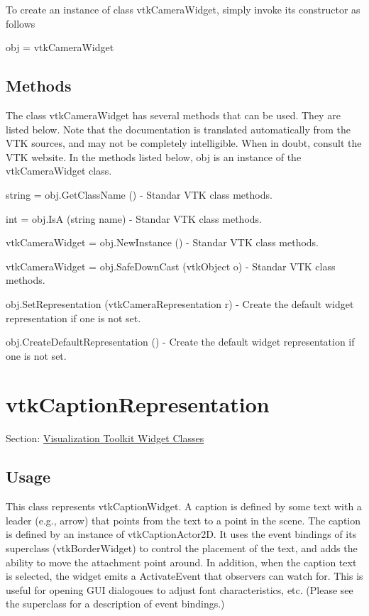 To create an instance of class vtk\-Camera\-Widget, simply invoke its constructor as follows \begin{DoxyVerb}  obj = vtkCameraWidget
\end{DoxyVerb}
 \hypertarget{vtkwidgets_vtkxyplotwidget_Methods}{}\subsection{Methods}\label{vtkwidgets_vtkxyplotwidget_Methods}
The class vtk\-Camera\-Widget has several methods that can be used. They are listed below. Note that the documentation is translated automatically from the V\-T\-K sources, and may not be completely intelligible. When in doubt, consult the V\-T\-K website. In the methods listed below, {\ttfamily obj} is an instance of the vtk\-Camera\-Widget class. 
\begin{DoxyItemize}
\item {\ttfamily string = obj.\-Get\-Class\-Name ()} -\/ Standar V\-T\-K class methods.  
\item {\ttfamily int = obj.\-Is\-A (string name)} -\/ Standar V\-T\-K class methods.  
\item {\ttfamily vtk\-Camera\-Widget = obj.\-New\-Instance ()} -\/ Standar V\-T\-K class methods.  
\item {\ttfamily vtk\-Camera\-Widget = obj.\-Safe\-Down\-Cast (vtk\-Object o)} -\/ Standar V\-T\-K class methods.  
\item {\ttfamily obj.\-Set\-Representation (vtk\-Camera\-Representation r)} -\/ Create the default widget representation if one is not set.  
\item {\ttfamily obj.\-Create\-Default\-Representation ()} -\/ Create the default widget representation if one is not set.  
\end{DoxyItemize}\hypertarget{vtkwidgets_vtkcaptionrepresentation}{}\section{vtk\-Caption\-Representation}\label{vtkwidgets_vtkcaptionrepresentation}
Section\-: \hyperlink{sec_vtkwidgets}{Visualization Toolkit Widget Classes} \hypertarget{vtkwidgets_vtkxyplotwidget_Usage}{}\subsection{Usage}\label{vtkwidgets_vtkxyplotwidget_Usage}
This class represents vtk\-Caption\-Widget. A caption is defined by some text with a leader (e.\-g., arrow) that points from the text to a point in the scene. The caption is defined by an instance of vtk\-Caption\-Actor2\-D. It uses the event bindings of its superclass (vtk\-Border\-Widget) to control the placement of the text, and adds the ability to move the attachment point around. In addition, when the caption text is selected, the widget emits a Activate\-Event that observers can watch for. This is useful for opening G\-U\-I dialogoues to adjust font characteristics, etc. (Please see the superclass for a description of event bindings.)

